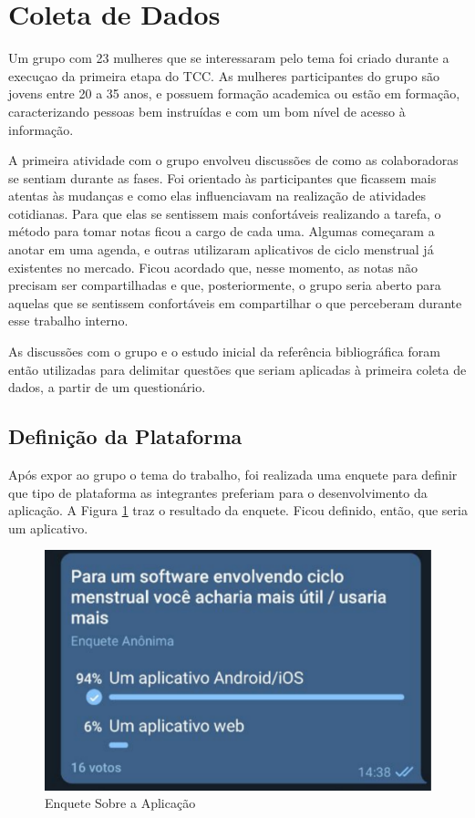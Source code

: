 \section{Coleta de Dados}

Um grupo com 23 mulheres que se interessaram pelo tema foi criado durante a execuçao da primeira etapa do TCC. 
As mulheres participantes do grupo são jovens entre 20 a 35 anos, e possuem 
formação academica ou estão em formação, caracterizando pessoas bem instruídas e com um bom 
nível de acesso à informação.

A primeira atividade com o grupo envolveu discussões de como as colaboradoras se sentiam durante as fases. Foi orientado
às participantes que ficassem mais atentas às mudanças e como elas influenciavam na realização de 
atividades cotidianas. Para que elas se sentissem mais confortáveis realizando a tarefa, o método para tomar notas ficou a cargo de cada uma. 
Algumas começaram a anotar em uma agenda, e outras utilizaram 
aplicativos de ciclo menstrual já existentes no mercado. Ficou acordado que, 
nesse momento, as notas não precisam ser compartilhadas e que, posteriormente, o grupo seria aberto para 
aquelas que se sentissem confortáveis em compartilhar o que perceberam 
durante esse trabalho interno.

As discussões com o grupo e o estudo inicial da referência bibliográfica foram então utilizadas para 
delimitar questões que seriam aplicadas à primeira coleta de dados, a partir de um questionário.

\subsection{Definição da Plataforma}

Após expor ao grupo o tema do trabalho, foi realizada uma enquete para definir que tipo de plataforma as 
integrantes preferiam para o desenvolvimento da aplicação. A Figura \ref{fig07} traz o resultado da enquete. 
Ficou definido, então, que seria um aplicativo.

\begin{figure}[ht]
	\caption{Enquete Sobre a Aplicação}
	\begin{center}
	\includegraphics[keepaspectratio=true,scale=0.3]{figuras/enqueteApp.pdf}
	\end{center}
    \label{fig07}
\end{figure}

